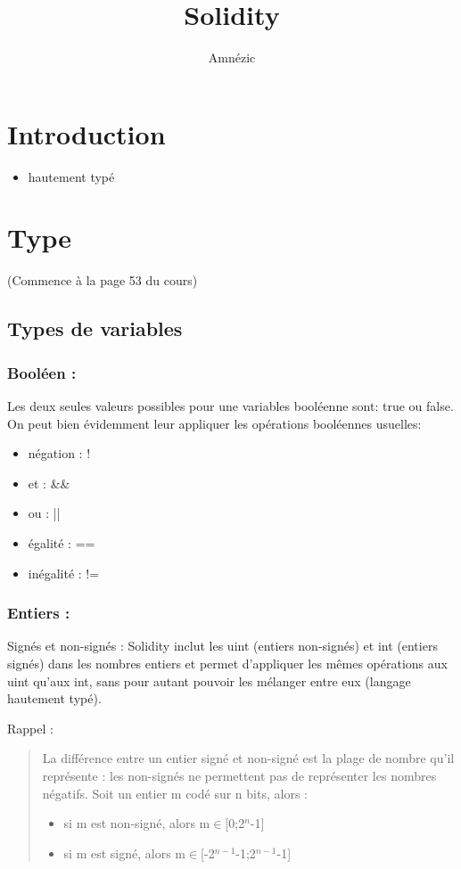 \documentclass{article}
\author{Amnézic}
\date{}
\title{Solidity}
\begin{document}
\maketitle
\newpage
\tableofcontents
\newpage

\section{Introduction}
\begin{itemize}
    \item hautement typé
\end{itemize}

\section{Type}
(Commence à la page 53 du cours)
\subsection{Types de variables}
\subsubsection{Booléen :}
Les deux seules valeurs possibles pour une variables booléenne sont: true ou false. On peut bien évidemment leur appliquer les opérations booléennes usuelles:
\begin{itemize}
    \item négation : !
    \item et : \&\&
    \item ou : ||
    \item égalité : ==
    \item inégalité : !=
\end{itemize}

\subsubsection{Entiers :}
Signés et non-signés :
Solidity inclut les uint (entiers non-signés) et int (entiers signés) dans les nombres entiers et permet d'appliquer les mêmes opérations aux uint qu'aux int, sans pour autant pouvoir les mélanger entre eux (langage hautement typé).\newline

\noindent Rappel :
\begin{quote}
    La différence entre un entier signé et non-signé est la plage de nombre qu'il représente : les non-signés ne permettent pas de représenter les nombres négatifs. Soit un entier m codé sur n bits, alors :
    \begin{itemize}
        \item si m est non-signé, alors m$\in$[0;2$^{n}$-1]
        \item si m est signé, alors m$\in$[-2$^{n-1}$-1;2$^{n-1}$-1]
    \end{itemize}
\end{quote}
\end{document}
